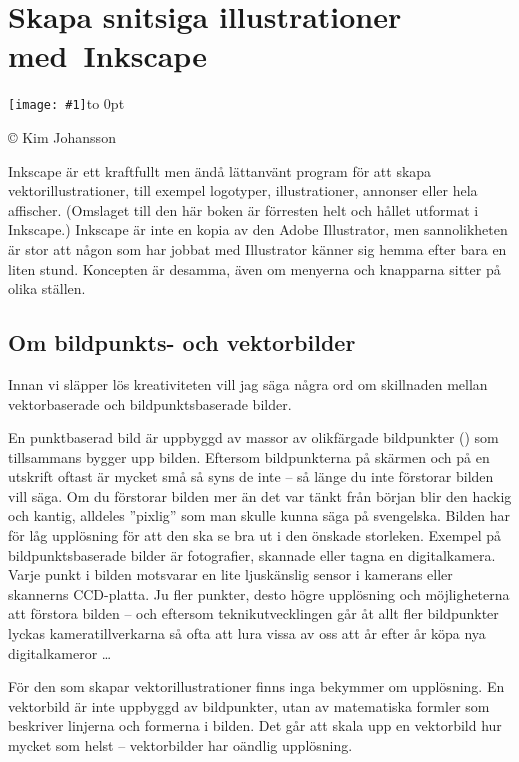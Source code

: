 \documentclass[a4paper,final]{memoir} %
\newcommand{\xrcredit}[1]{\hbox to 0pt{\hspace*{.6\baselineskip}\begin{rotate}{90}{\usefont{T1}{phv}{m}{n}\selectfont\tiny #1}\end{rotate}}}
\newcommand\xintropic[1]{{\texttt{[image: \#1]}\xrcredit{\copyright{} Kim Johansson}}\medskip}
\newcommand\xchapter[2]{\chapter{#2}\begin{center}\xintropic{#1}\end{center}}
\begin{document}

\xchapter{bilder804-all/Skapa_vektorillustrationer}{Skapa snitsiga illustrationer \hbox{med Inkscape}}




Inkscape är ett kraftfullt men ändå lättanvänt program för att skapa vektorillustrationer, till exempel logotyper, illustrationer, annonser eller hela affischer. (Omslaget till den här boken är förresten helt och hållet utformat i Inkscape.) Inkscape är inte en kopia av den Adobe Illustrator, men sannolikheten är stor att någon som har jobbat med Illustrator känner sig hemma efter bara en liten stund. Koncepten är desamma, även om menyerna och knapparna sitter på olika ställen.

\section{Om bildpunkts- och vektorbilder}


Innan vi släpper lös kreativiteten vill jag säga några ord om skillnaden mellan vektorbaserade och bildpunktsbaserade bilder. 

En punktbaserad bild är uppbyggd av massor av olikfärgade bildpunkter () som tillsammans bygger upp bilden. Eftersom bildpunkterna på skärmen och på en utskrift oftast är mycket små så syns de inte -- så länge du inte förstorar bilden vill säga. Om du förstorar bilden mer än det var tänkt från början blir den hackig och kantig, alldeles ''pixlig'' som man skulle kunna säga på svengelska. Bilden har för låg upplösning för att den ska se bra ut i den önskade storleken. Exempel på bildpunktsbaserade bilder är fotografier, skannade eller tagna en digitalkamera. Varje punkt i bilden motsvarar en lite ljuskänslig sensor i kamerans eller skannerns CCD-platta. Ju fler punkter, desto högre upplösning och möjligheterna att förstora bilden -- och eftersom teknikutvecklingen går åt allt fler bildpunkter lyckas  kameratillverkarna så ofta att lura vissa av oss att år efter år köpa nya digitalkameror \ldots{}

För den som skapar vektorillustrationer finns inga bekymmer om upplösning. En vektorbild är inte uppbyggd av bildpunkter, utan av matematiska formler som beskriver linjerna och formerna i bilden. Det går att skala upp en vektorbild hur mycket som helst -- vektorbilder har oändlig upplösning.
\end{document}
